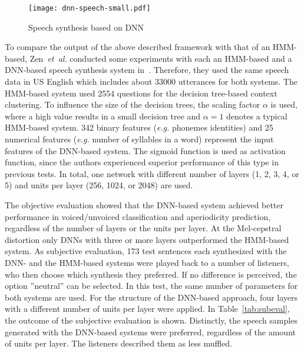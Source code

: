 \begin{figure}[h]
	\texttt{[image: dnn-speech-small.pdf]}
	\caption{Speech synthesis based on \ac{DNN}~\cite{zen:deepstatistical}}
	\label{fig:dnnspeech}
\end{figure}

To compare the output of the above described framework with that of an \ac{HMM}-based, Zen~\textit{et~al.} conducted some experiments with each an \ac{HMM}-based and a \ac{DNN}-based speech synthesis system in~\cite{zen:deepstatistical}. Therefore, they used the same speech data in US English which includes about 33000 utterances for both systems. The \ac{HMM}-based system used 2554 questions for the decision tree-based context clustering. To influence the size of the decision trees, the scaling factor $\alpha$ is used, where a high value results in a small decision tree and $\alpha = 1$ denotes a typical \ac{HMM}-based system. 342 binary features (\textit{e.g.} phonemes identities) and 25 numerical features (\textit{e.g.} number of syllables in a word) represent the input features of the \ac{DNN}-based system. The sigmoid function is used as activation function, since the authors experienced superior performance of this type in previous tests. In total, one network with different number of layers (1, 2, 3, 4, or 5) and units per layer (256, 1024, or 2048) are used.

The objective evaluation showed that the \ac{DNN}-based system achieved better performance in voiced/unvoiced classification and aperiodicity prediction, regardless of the number of layers or the units per layer. At the Mel-cepstral distortion only \acp{DNN} with three or more layers outperformed the \ac{HMM}-based system. 
As subjective evaluation, 173 test sentences each synthesized with the \ac{DNN}- and the \ac{HMM}-based systems were played back to a number of listeners, who then choose which synthesis they preferred. If no difference is perceived, the option ''neutral'' can be selected. In this test, the same number of parameters for both systems are used. For the structure of the \ac{DNN}-based approach, four layers with a different number of units per layer were applied. In Table~\ref{tab:subeval}, the outcome of the subjective evaluation is shown. Distinctly, the speech samples generated with the \ac{DNN}-based systems were preferred, regardless of the amount of units per layer. The listeners described them as less muffled.

